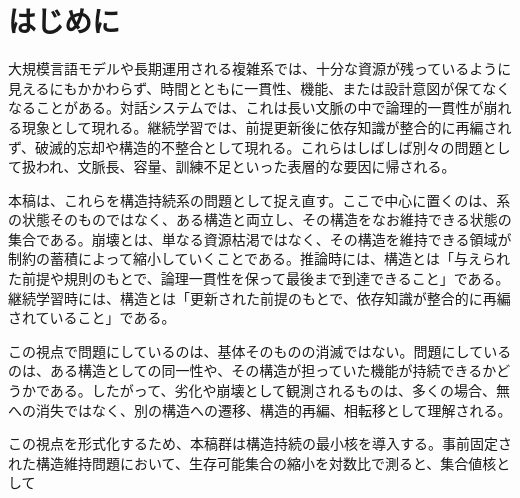 \documentclass[12pt,a4paper]{article}
\begin{document}
\begin{abstract}
経験的主張として現時点で前面に出すべきものは三つである。第一に、LLM 推論実験では、単なる文脈長ではなく構造矛盾の質が崩壊を予測する。第二に、ランダム 3-SAT の計算コストは、構造的パラメータ \(L\) に対して \(\mu_{c} \propto e^{cL}\) の形で整理される。第三に、Mixed-SAT/NAE-SAT では、ドリフトで重みづけした \texttt{L\_plus\_n} predictor が raw count + \(n\) baseline を上回り、その凍結済み検証パッケージは外部実行者 3 名による再実行でも primary output と support flags が再現された。ただし、これは普遍法則の確立ではなく、観測可能性の層に応じた主張強度を分けた経験的支持である。詳細な数値、no-support branch、未完了の別系統 replication は evidence map と各 analysis note に委ねる。

本稿は、主理論 spine、仕様固定構造層、構造推定層、条件付き構造埋め込み層、実装含意を一つの見取り図として提示するための入口であり、詳細な導出と実験条件は各分冊および補論に委ねる。
\end{abstract}

\section{はじめに}\label{ux306fux3058ux3081ux306b}

大規模言語モデルや長期運用される複雑系では、十分な資源が残っているように見えるにもかかわらず、時間とともに一貫性、機能、または設計意図が保てなくなることがある。対話システムでは、これは長い文脈の中で論理的一貫性が崩れる現象として現れる。継続学習では、前提更新後に依存知識が整合的に再編されず、破滅的忘却や構造的不整合として現れる。これらはしばしば別々の問題として扱われ、文脈長、容量、訓練不足といった表層的な要因に帰される。

本稿は、これらを構造持続系の問題として捉え直す。ここで中心に置くのは、系の状態そのものではなく、ある構造と両立し、その構造をなお維持できる状態の集合である。崩壊とは、単なる資源枯渇ではなく、その構造を維持できる領域が制約の蓄積によって縮小していくことである。推論時には、構造とは「与えられた前提や規則のもとで、論理一貫性を保って最後まで到達できること」である。継続学習時には、構造とは「更新された前提のもとで、依存知識が整合的に再編されていること」である。

この視点で問題にしているのは、基体そのものの消滅ではない。問題にしているのは、ある構造としての同一性や、その構造が担っていた機能が持続できるかどうかである。したがって、劣化や崩壊として観測されるものは、多くの場合、無への消失ではなく、別の構造への遷移、構造的再編、相転移として理解される。

この視点を形式化するため、本稿群は構造持続の最小核を導入する。事前固定された構造維持問題において、生存可能集合の縮小を対数比で測ると、集合値核として
\end{document}
